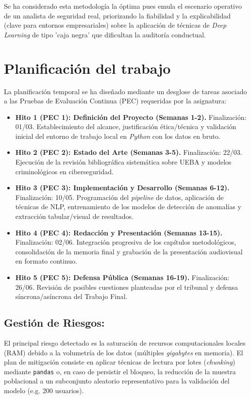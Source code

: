 \documentclass[IB]{TFUOC}%
\begin{document}
\noindent Se ha considerado esta metodología la óptima pues emula el escenario operativo de un analista de seguridad real, priorizando la fiabilidad y la explicabilidad (clave para entornos empresariales) sobre la aplicación de técnicas de \textit{Deep Learning} de tipo 'caja negra' que dificultan la auditoría conductual.


\section{Planificación del trabajo}

La planificación temporal se ha diseñado mediante un desglose de tareas asociado a las Pruebas de Evaluación Continua (PEC) requeridas por la asignatura:

\begin{itemize}
    \item \textbf{Hito 1 (PEC 1): Definición del Proyecto (Semanas 1-2).} Finalización: 01/03. Establecimiento del alcance, justificación ética/técnica y validación inicial del entorno de trabajo local en \textit{Python} con los datos en bruto.
    \item \textbf{Hito 2 (PEC 2): Estado del Arte (Semanas 3-5).} Finalización: 22/03. Ejecución de la revisión bibliográfica sistemática sobre UEBA y modelos criminológicos en ciberseguridad.
    \item \textbf{Hito 3 (PEC 3): Implementación y Desarrollo (Semanas 6-12).} Finalización: 10/05. Programación del \textit{pipeline} de datos, aplicación de técnicas de NLP, entrenamiento de los modelos de detección de anomalías y extracción tabular/visual de resultados.
    \item \textbf{Hito 4 (PEC 4): Redacción y Presentación (Semanas 13-15).} Finalización: 02/06. Integración progresiva de los capítulos metodológicos, consolidación de la memoria final y grabación de la presentación audiovisual en formato continuo.
    \item \textbf{Hito 5 (PEC 5): Defensa Pública (Semanas 16-19).} Finalización: 26/06. Revisión de posibles cuestiones planteadas por el tribunal y defensa síncrona/asíncrona del Trabajo Final.
\end{itemize}

\subsection{Gestión de Riesgos:}

El principal riesgo detectado es la saturación de recursos computacionales locales (RAM) debido a la volumetría de los datos (múltiples \textit{gigabytes} en memoria). El plan de mitigación consiste en aplicar técnicas de lectura por lotes (\textit{chunking}) mediante \texttt{pandas} o, en caso de persistir el bloqueo, la reducción de la muestra poblacional a un subconjunto aleatorio representativo para la validación del modelo (e.g. 200 usuarios).
\end{document}
